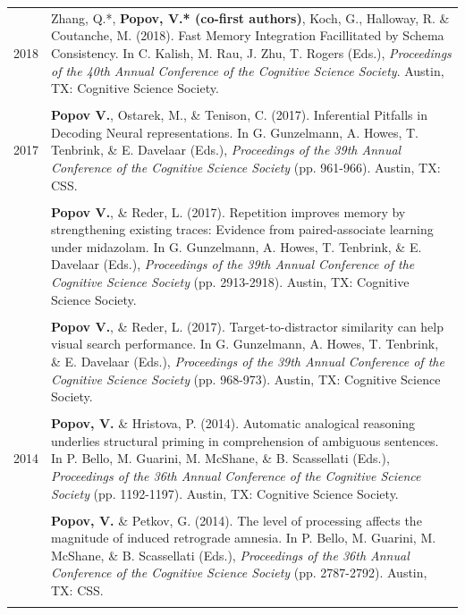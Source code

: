 \documentclass[letterpaper]{article}
\begin{document}
\begin{longtable}{p{0.7cm}p{15cm}}
2018  &  Zhang, Q.*, \textbf{Popov, V.* (co-first authors)}, Koch, G., Halloway, R. \& Coutanche, M. (2018). Fast Memory Integration Facillitated by Schema Consistency. In C. Kalish, M. Rau, J. Zhu, T. Rogers (Eds.), {\it Proceedings of the 40th Annual Conference of the Cognitive Science Society}. Austin, TX: Cognitive Science Society.\\[6pt]
&\\
2017 & \textbf{Popov V.}, Ostarek, M., \& Tenison, C. (2017). Inferential Pitfalls in Decoding Neural representations. In G. Gunzelmann, A. Howes, T. Tenbrink, \& E. Davelaar (Eds.), {\it Proceedings of the 39th Annual Conference of the Cognitive Science Society} (pp. 961-966). Austin, TX: CSS.\\[6pt]
 &\\
& \textbf{Popov V.}, \& Reder, L. (2017). Repetition improves memory by strengthening existing traces: Evidence from paired-associate learning under midazolam. In G. Gunzelmann, A. Howes, T. Tenbrink, \& E. Davelaar (Eds.), {\it Proceedings of the 39th Annual Conference of the Cognitive Science Society} (pp. 2913-2918). Austin, TX: Cognitive Science Society.\\[6pt]
 &\\
& \textbf{Popov V.}, \& Reder, L. (2017). Target-to-distractor similarity can help visual search performance. In G. Gunzelmann, A. Howes, T. Tenbrink, \& E. Davelaar (Eds.), {\it Proceedings of the 39th Annual Conference of the Cognitive Science Society} (pp. 968-973). Austin, TX: Cognitive Science Society.\\[6pt]
 &\\
2014 & \textbf{Popov, V.} \& Hristova, P. (2014). Automatic analogical reasoning underlies structural priming in comprehension of ambiguous sentences. In P. Bello, M. Guarini, M. McShane, \& B. Scassellati (Eds.), {\it Proceedings of the 36th Annual Conference of the Cognitive Science Society} (pp. 1192-1197). Austin, TX: Cognitive Science Society.\\[6pt]
 &\\
&  	\textbf{Popov, V.} \& Petkov, G. (2014). The level of processing affects the magnitude of induced retrograde amnesia. In P. Bello, M. Guarini, M. McShane, \& B. Scassellati (Eds.), {\it Proceedings of the 36th Annual Conference of the Cognitive Science Society} (pp. 2787-2792). Austin, TX: CSS.\\[18pt]
 &\\
\end{longtable}
\end{document}
